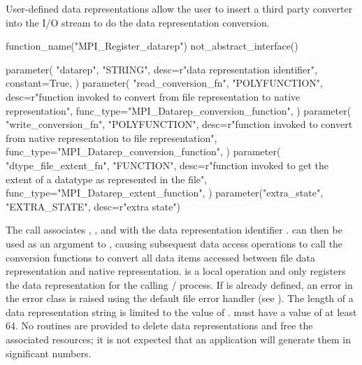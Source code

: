 User-defined data representations allow the user to insert a third
party converter into the I/O stream to do the data representation conversion.

%
%
\begin{mpi-binding}
    function_name("MPI_Register_datarep")
    not_abstract_interface()

    parameter(
        "datarep",
        "STRING",
        desc=r"data representation identifier",
        constant=True,
    )
    parameter(
        "read_conversion_fn",
        "POLYFUNCTION",
        desc=r"function invoked to convert from file representation to native representation",
        func_type="MPI_Datarep_conversion_function",
    )
    parameter(
        "write_conversion_fn",
        "POLYFUNCTION",
        desc=r"function invoked to convert from native representation to file representation",
        func_type="MPI_Datarep_conversion_function",
    )
    parameter(
        "dtype_file_extent_fn",
        "FUNCTION",
        desc=r"function invoked to get the extent of a datatype as represented in the file",
        func_type="MPI_Datarep_extent_function",
    )
    parameter("extra_state", "EXTRA_STATE", desc=r"extra state")
\end{mpi-binding}

The call associates ,
, and
with the data representation identifier .
 can then be used as an argument
to , causing
subsequent data access operations to call the conversion functions
to convert all data items accessed between file data representation
and native representation.
 is a local operation and only registers the
data representation
for the calling \MPI/ process.
If  is already defined,
an error in the error class  is raised
using the default file error handler (see ).
The length of a data representation string is limited to the value of
.
 must have a value of at least 64.
No routines are provided to delete data representations and
free the associated resources;
it is not expected that an application
will generate them in significant numbers.

